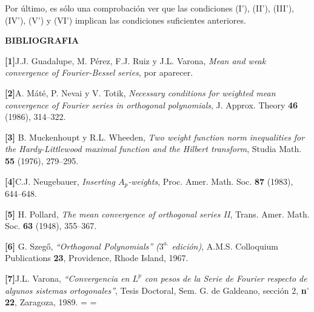 Por \'ultimo, es s\'olo una comprobaci\'on ver que las condiciones (I'),
(II'), (III'), (IV'), (V') y (VI') implican las condiciones suficientes
anteriores. \vskip 10pt 

\centerline {\bf BIBLIOGRAFIA}

\frenchspacing
\def\raya{\vrule height 0.1pt depth 0.5pt width 15mm}
\vskip 7pt

\item {{\bf [1]}}J.J. Guadalupe, M. P\'erez, F.J. Ruiz y J.L. Varona, {\it
Mean and weak convergence of Fourier-Bessel series}, por aparecer.
\vskip 5pt

\item {{\bf [2]}}A. M\'at\'e, P. Nevai y V. Totik, {\it Necessary
conditions for weighted mean convergence of Fourier series in orthogonal
polynomials}, J. Approx. Theory {\bf 46} (1986), 314--322.
\vskip 5pt

\item {{\bf [3]}} B. Muckenhoupt y R.L. Wheeden, {\it  Two weight function
norm inequalities for the Hardy-Littlewood maximal function and the Hilbert
transform}, Studia Math. {\bf 55} (1976), 279--295. 
\vskip 5pt

\item {{\bf [4]}}C.J. Neugebauer, {\it Inserting $A_p$-weights}, Proc. Amer.
Math. Soc. {\bf 87} (1983), 644--648.
\vskip 5pt

\item {{\bf [5]}} H. Pollard, {\it The mean convergence of orthogonal series
II}, Trans. Amer. Math. Soc. {\bf 63} (1948), 355--367.
\vskip 5pt

\item {{\bf [6]}} G. Szeg\H{o}, {\it ``Orthogonal Polynomials'' ($3^{a.}$
edici\'on)}, A.M.S. Colloquium Publications {\bf 23}, Providence, Rhode Island,
1967.
\vskip 5pt

\item {{\bf [7]}}J.L. Varona, {\it ``Convergencia en $L^p$ con
pesos de la Serie de Fourier respecto de algunos sistemas ortogonales''}, Tesis
Doctoral, Sem. G. de Galdeano, secci\'on 2, {\bf n$^\circ$ 22}, Zaragoza, 1989. 
\vskip 1cm
=
=
\bye
